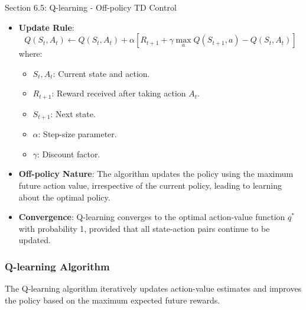 \begin{notes}{Section 6.5: Q-learning - Off-policy TD Control}
\begin{highlight}
        \begin{itemize}
            \item \textbf{Update Rule}:
            \[
            Q(S_t, A_t) \leftarrow Q(S_t, A_t) + \alpha \left[ R_{t+1} + \gamma \max_a Q(S_{t+1}, a) - Q(S_t, A_t) \right]
            \]
            where:
            \begin{itemize}
                \item $S_t, A_t$: Current state and action.
                \item $R_{t+1}$: Reward received after taking action $A_t$.
                \item $S_{t+1}$: Next state.
                \item $\alpha$: Step-size parameter.
                \item $\gamma$: Discount factor.
            \end{itemize}
            \item \textbf{Off-policy Nature}: The algorithm updates the policy using the maximum future action value, irrespective of the current policy, leading to learning about the optimal policy.
            \item \textbf{Convergence}: Q-learning converges to the optimal action-value function $q^*$ with probability 1, provided that all state-action pairs continue to be updated.
        \end{itemize}
    
    \end{highlight}
    
    \subsubsection*{Q-learning Algorithm}
    
    The Q-learning algorithm iteratively updates action-value estimates and improves the policy based on the maximum expected future rewards.
    
    \begin{highlight}
    

\end{highlight}
\end{notes}
